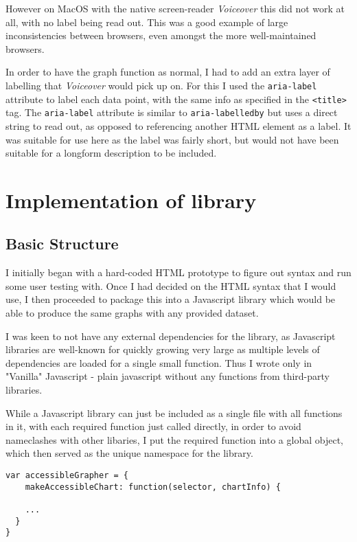 \documentclass[ %
                    author={Aleena Baig},
                supervisor={Dr Simon Lock},
                    degree={BSc},
                     title={On Making Web Accessible Graphs},
                  subtitle={},
                      year={2019} ]{dissertation}
\begin{document}
However on MacOS with the native screen-reader \textit{Voiceover} this did not work at all, with no label being read out. This was a good example of large inconsistencies between browsers, even amongst the more well-maintained browsers.

In order to have the graph function as normal, I had to add an extra layer of labelling that \textit{Voiceover} would pick up on. For this I used the \texttt{aria-label} attribute to label each data point, with the same info as specified in the \texttt{<title>} tag. The \texttt{aria-label} attribute is similar to \texttt{aria-labelledby} but uses a direct string to read out, as opposed to referencing another HTML element as a label. It was suitable for use here as the label was fairly short, but would not have been suitable for a longform description to be included.

\section{Implementation of library}

\subsection{Basic Structure}

I initially began with a hard-coded HTML prototype to figure out syntax and run some user testing with. Once I had decided on the HTML syntax that I would use, I then proceeded to package this into a Javascript library which would be able to produce the same graphs with any provided dataset.

I was keen to not have any external dependencies for the library, as Javascript libraries are well-known for quickly growing very large as multiple levels of dependencies are loaded for a single small function. Thus I wrote only in "Vanilla" Javascript - plain javascript without any functions from third-party libraries.

While a Javascript library can just be included as a single file with all functions in it, with each required function just called directly, in order to avoid nameclashes with other libaries, I put the required function into a global object, which then served as the unique namespace for the library.
\newline
\begin{lstlisting}
var accessibleGrapher = {
    makeAccessibleChart: function(selector, chartInfo) {

    ...
  }
}
\end{lstlisting}
\end{document}
